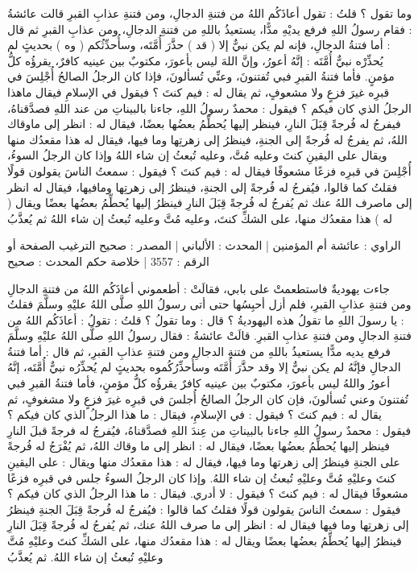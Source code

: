 وما تقول ؟ قلتُ : تقول أعاذَكُم اللهُ من فتنةِ الدجالِ، ومن فتنةِ عذابِ القبرِ قالت عائشةُ : فقام رسولُ اللهِ فرفع يديْهِ مدًّا، يستعيذُ باللهِ من فتنةِ الدجالِ، ومن عذابِ القبرِ ثم قال : أما فتنةُ الدجالِ، فإنه لم يكن نبيٌّ إلا ( قد ) حذَّرَ أُمَّتَه، وسأُحدِّثُكم ( وه ) بحديثٍ لم يُحذِّرْه نبيٌّ أُمَّتَه : إنَّهُ أعورُ، وإنَّ اللهَ ليس بأعورَ، مكتوبٌ بين عينيه كافرٌ، يقرؤُه كلُّ مؤمنٍ. فأما فتنةُ القبرِ فبي تُفتنونَ، وعنِّي تُسألونَ، فإذا كان الرجلُ الصالحُ أُجْلِسَ في قبرِه غيرَ فزعٍ ولا مشعوفٍ، ثم يقال له : فيم كنتَ ؟ فيقول في الإسلامِ فيقال ماهذا الرجلُ الذي كان فيكم ؟ فيقول : محمدٌ رسولُ اللهِ، جاءنا بالبيناتِ من عند اللهِ فصدَّقناهُ، فيفرجُ له فُرجةً قِبَلَ النارِ، فينظر إليها يُحطِّمُ بعضُها بعضًا، فيقال له : انظر إلى ماوقاك اللهُ، ثم يفرجُ له فُرجةً إلى الجنةِ، فينظرُ إلى زهرتِها وما فيها، فيقال له هذا مقعدُك منها ويقال على اليقينِ كنتَ وعليه مُتَّ، وعليه تُبعثُ إن شاء اللهُ وإذا كان الرجلُ السوءُ، أُجْلِسَ في قبرِه فزعًا مشعوفًا فيقال له : فيم كنتَ ؟ فيقول : سمعتُ الناسَ يقولون قولًا فقلتُ كما قالوا، فيُفرجُ له فُرجةً إلى الجنةِ، فينظرُ إلى زهرتِها ومافيها، فيقال له انظر إلى ماصرف اللهُ عنك ثم يُفرجُ له فُرجةً قِبَلَ النارِ فينظرُ إليها يُحطِّمُ بعضُها بعضًا ويقال ( له ) هذا مقعدُك منها، على الشكِّ كنتَ، وعليه مُتَّ وعليه تُبعثُ إن شاء اللهُ ثم يُعذَّبُ

الراوي : عائشة أم المؤمنين | المحدث : الألباني | المصدر : صحيح الترغيب
الصفحة أو الرقم : 3557 | خلاصة حكم المحدث : صحيح 


جاءت يهوديةٌ فاستطعمتْ على بابي، فقالَتْ : أطعموني أعاذَكُم اللهُ من فتنةِ الدجالِ ومن فتنةِ عذابِ القبرِ، فلم أزل أحبِسُها حتى أتى رسولُ اللهِ صلَّى اللهُ عليْهِ وسلَّمَ فقلتُ : يا رسولَ اللهِ ما تقولُ هذه اليهوديةُ ؟ قال : وما تقولُ ؟ قلتُ : تقولُ : أعاذَكُم اللهُ من فتنةِ الدجالِ ومن فتنةِ عذابِ القبرِ. قالَتْ عائشةُ : فقال رسولُ اللهِ صلَّى اللهُ عليْهِ وسلَّمَ فرفع يديه مدًّا يستعيذُ باللهِ من فتنةِ الدجالِ ومن فتنةِ عذابِ القبرِ، ثم قال : أما فتنةُ الدجالِ فإنَّهُ لم يكن نبيٌّ إلا وقد حذَّرَ أُمَّتَه وسأُحذِّرُكُموه بحديثٍ لم يُحذِّرُه نبيٌّ أُمَّتَه، إنَّهُ أعورُ واللهُ ليس بأعورَ، مكتوبٌ بين عينيه كافرٌ يقرؤُه كلُّ مؤمنٍ، فأما فتنةُ القبرِ فبي تُفتنونَ وعني تُسألونَ، فإن كان الرجلُ الصالحُ أُجلسَ في قبرِه غيرَ فزعٍ ولا مشغوفٍ، ثم يقال له : فيم كنتَ ؟ فيقول : في الإسلامِ، فيقال : ما هذا الرجلُ الذي كان فيكم ؟ فيقول : محمدٌ رسولُ اللهِ جاءنا بالبيناتِ من عِندَ اللهِ فصدَّقناهُ، فيُفرجُ له فرجةً قبلَ النارِ فينظر إليها يُحطِّمُ بعضُها بعضًا، فيقال له : انظر إلى ما وقاك اللهُ، ثم يُفْرَجُ له فُرجةً على الجنةِ فينظرُ إلى زهرتها وما فيها، فيقال له : هذا مقعدُك منها ويقال : على اليقينِ كنتَ وعليْهِ مُتَّ وعليْهِ تُبعثُ إن شاء اللهُ. وإذا كان الرجلُ السوءُ جلس في قبرِه فزعًا مشعوفًا فيقال له : فيم كنتَ ؟ فيقول : لا أدري. فيقال : ما هذا الرجلُ الذي كان فيكم ؟ فيقول : سمعتُ الناسَ يقولون قولًا فقلتُ كما قالوا : فيُفرجُ له فُرجةً قِبَلَ الجنةِ فينظرُ إلى زهرتِها وما فيها فيقال له : انظر إلى ما صرف اللهُ عنك، ثم يُفرجُ له فُرجةً قِبَلَ النارِ فينظرُ إليها يُحطِّمُ بعضُها بعضًا ويقال له : هذا مقعدُك منها، على الشكِّ كنتَ وعليْهِ مُتَّ وعليْهِ تُبعثُ إن شاء اللهُ. ثم يُعذَّبُ

